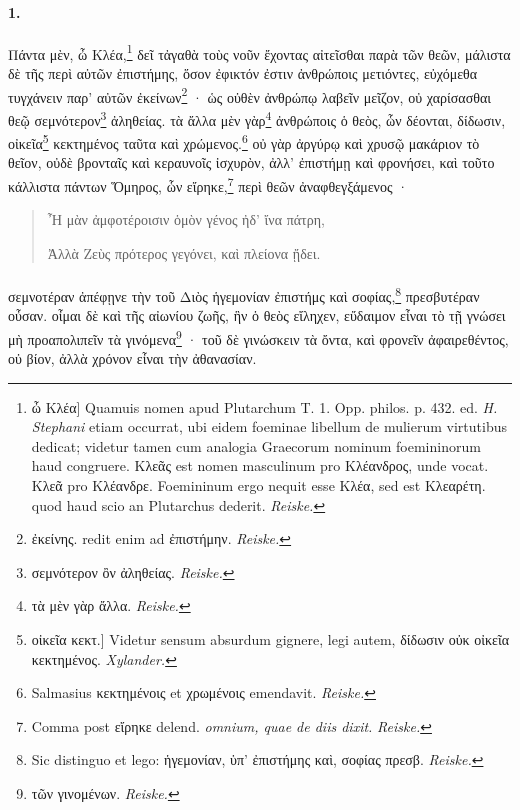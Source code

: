 \documentclass[a4paper, 11pt, oneside, polutonikogreek, german]{article}
\begin{document}
\paragraph{1.}
Πάντα μὲν, ὦ Κλέα,\footnote{ὦ Κλέα] Quamuis nomen apud Plutarchum T. 1. Opp. philos. p. 432. ed. \emph{H. Stephani} etiam occurrat, ubi eidem foeminae libellum de mulierum virtutibus dedicat; videtur tamen cum analogia Graecorum nominum foemininorum haud congruere. Κλεᾶς est nomen masculinum pro Κλέανδρος, unde vocat. Κλεᾶ pro Κλέανδρε. Foemininum ergo nequit esse Κλέα, sed est Κλεαρέτη. quod haud scio an Plutarchus dederit. \emph{Reiske.}} δεῖ τἀγαθὰ τοὺς νοῦν ἔχοντας αἰτεῖσθαι παρὰ τῶν θεῶν, μάλιστα δὲ τῆς περὶ αὐτῶν ἐπιστήμης, ὅσον ἐφικτόν ἐστιν ἀνθρώποις μετιόντες, εὐχόμεθα τυγχάνειν παρ' αὐτῶν ἐκείνων\footnote{ἐκείνης. redit enim ad ἐπιστήμην. \emph{Reiske.}} · ὡς οὐθὲν ἀνθρώπῳ λαβεῖν μεῖζον, οὐ χαρίσασθαι θεῷ σεμνότερον\footnote{σεμνότερον ὂν ἀληθείας. \emph{Reiske.}} ἀληθείας. τὰ ἄλλα μὲν γὰρ\footnote{τὰ μὲν γὰρ ἄλλα. \emph{Reiske.}} ἀνθρώποις ὁ θεὸς, ὧν δέονται, δίδωσιν, οἰκεῖα\footnote{οἰκεῖα κεκτ.] Videtur sensum absurdum gignere, legi autem, δίδωσιν οὐκ οἰκεῖα κεκτημένος. \emph{Xylander.}} κεκτημένος ταῦτα καὶ χρώμενος.\footnote{Salmasius κεκτημένοις et χρωμένοις emendavit. \emph{Reiske.}} οὐ γὰρ ἀργύρῳ καὶ χρυσῷ μακάριον τὸ θεῖον, οὐδὲ βρονταῖς καὶ κεραυνοῖς ἰσχυρὸν, ἀλλ' ἐπιστήμῃ καὶ φρονήσει, καὶ τοῦτο κάλλιστα πάντων Ὅμηρος, ὧν εἴρηκε,\footnote{Comma post εἴρηκε delend. \emph{omnium, quae de diis dixit.} \emph{Reiske.}} περὶ θεῶν ἀναφθεγξάμενος ·
\begin{quotation}\tiny
Ἦ μὰν ἀμφοτέροισιν ὁμὸν γένος ἠδ' ἴνα πάτρη,

Ἀλλὰ Ζεὺς πρότερος γεγόνει, καὶ πλείονα ᾔδει.
\end{quotation}
\paragraph{}
σεμνοτέραν ἀπέφῃνε τὴν τοῦ Διὸς ἡγεμονίαν ἐπιστήμς καὶ σοφίας,\footnote{Sic distinguo et lego: ἡγεμονίαν, ὑπ' ἐπιστήμης καὶ, σοφίας πρεσβ. \emph{Reiske.}} πρεσβυτέραν οὖσαν. οἶμαι δὲ καὶ τῆς αἰωνίου ζωῆς, ἣν ὁ θεὸς εἴληχεν, εὔδαιμον εἶναι τὸ τῇ γνώσει μὴ προαπολιπεῖν τὰ γινόμενα\footnote{τῶν γινομένων. \emph{Reiske.}} · τοῦ δὲ γινώσκειν τὰ ὄντα, καὶ φρονεῖν ἀφαιρεθέντος, οὐ βίον, ἀλλὰ χρόνον εἶναι τὴν ἀθανασίαν.
\end{document}
